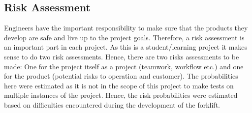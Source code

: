 \documentclass[../report.tex]{subfiles}
\begin{document}
\subsection{Risk Assessment}
Engineers have the important responsibility to make sure that the products
they develop are safe and live up to the project goals. Therefore, a
risk assessment is an important part in each project. As this is a student/learning
project it makes sense to do two risk assessments. Hence, there are two risks assessments to be made: 
One for the project itself as a project (teamwork, workflow etc.) and one for the product (potential risks to 
operation and customer). The probabilities here were estimated as it is not in the scope of 
this project to make tests on multiple instances of the project. Hence, the risk probabilities were estimated 
based on difficulties encountered during the development of the forklift.
\end{document}
